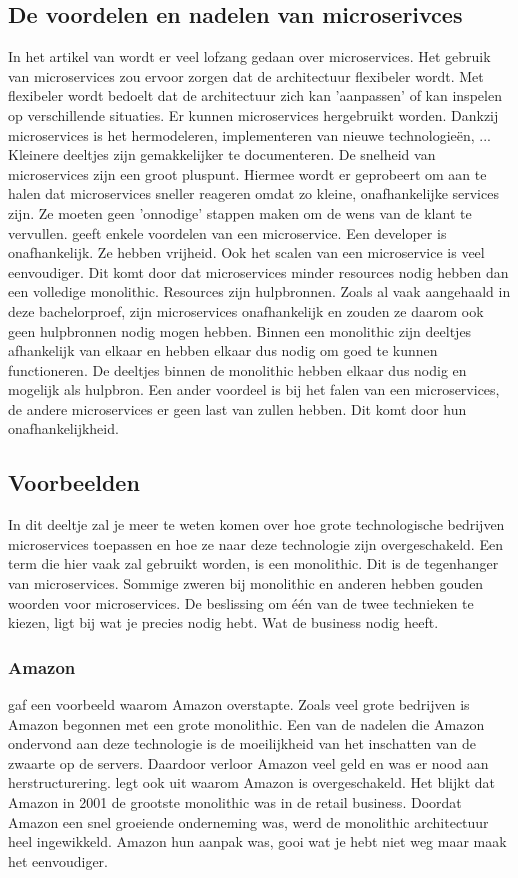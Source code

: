 \subsection{De voordelen en nadelen van microserivces}
In het artikel van \textcite{series2018} wordt er veel lofzang gedaan over microservices. Het gebruik van microservices zou ervoor zorgen dat de architectuur flexibeler wordt. Met flexibeler wordt bedoelt dat de architectuur zich kan 'aanpassen' of kan inspelen op verschillende situaties. Er kunnen microservices hergebruikt worden. Dankzij microservices is het hermodeleren, implementeren van nieuwe technologieën, ... 
Kleinere deeltjes zijn gemakkelijker te documenteren. De snelheid van microservices zijn een groot pluspunt. Hiermee wordt er geprobeert om aan te halen dat microservices sneller reageren omdat zo kleine, onafhankelijke services zijn. Ze moeten geen 'onnodige' stappen maken om de wens van de klant te vervullen. 
\textcite{Watts2018} geeft enkele voordelen van een microservice. Een developer is onafhankelijk. Ze hebben vrijheid. Ook het scalen van een microservice is veel eenvoudiger. Dit komt door dat microservices minder resources nodig hebben dan een volledige monolithic. Resources zijn hulpbronnen. Zoals al vaak aangehaald in deze bachelorproef, zijn microservices onafhankelijk en zouden ze daarom ook geen hulpbronnen nodig mogen hebben. Binnen een monolithic zijn deeltjes afhankelijk van elkaar en hebben elkaar dus nodig om goed te kunnen functioneren. De deeltjes binnen de monolithic hebben elkaar dus nodig en mogelijk als hulpbron. Een ander voordeel is bij het falen van een microservices, de andere microservices er geen last van zullen hebben. Dit komt door hun onafhankelijkheid. 
\subsection{Voorbeelden}
In dit deeltje zal je meer te weten komen over hoe grote technologische bedrijven microservices toepassen en hoe ze naar deze technologie zijn overgeschakeld.
Een term die hier vaak zal gebruikt worden, is een monolithic. Dit is de tegenhanger van microservices. Sommige zweren bij monolithic en anderen hebben gouden woorden voor microservices. De beslissing om één van de twee technieken te kiezen, ligt bij wat je precies nodig hebt. Wat de business nodig heeft. 

\subsubsection{Amazon}
\textcite{Mauersberger2017} gaf een voorbeeld waarom Amazon overstapte. Zoals veel grote bedrijven is Amazon begonnen met een grote monolithic. Een van de nadelen die Amazon ondervond aan deze technologie is de moeilijkheid van het inschatten van de zwaarte op de servers. Daardoor verloor Amazon veel geld en was er nood aan herstructurering.
\textcite{Fulton2015} legt ook uit waarom Amazon is overgeschakeld. Het blijkt dat Amazon in 2001 de grootste monolithic was in de retail business. Doordat Amazon een snel groeiende onderneming was, werd de monolithic architectuur heel ingewikkeld. Amazon hun aanpak was, gooi wat je hebt niet weg maar maak het eenvoudiger. 
